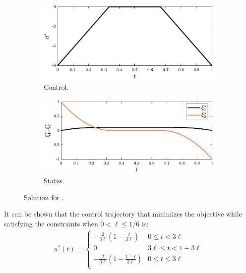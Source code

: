 \begin{figure}
\centering

\begin{subfigure}{0.5\textwidth}
\centering
\includegraphics[width=\textwidth]{../ch5/figures/ex2sol-controls}%
\caption{Control.}
\label{fig:ch5:ex2sol:controls}
\end{subfigure}%
\begin{subfigure}{0.5\textwidth}
\centering
\includegraphics[width=\textwidth]{../ch5/figures/ex2sol-states}%
\caption{States.}
\label{fig:ch5:ex2sol:states}
\end{subfigure}%

\caption{Solution for .}
\label{fig:ch5:ex2sol}
\end{figure}

It can be shown that the control trajectory that minimizes the objective while satisfying the constraints when $0 < \ell \leq 1/6$ is:
\begin{align}
u^*(t) = \begin{cases}
-\frac{2}{3\ell}\left( 1 - \frac{t}{3\ell} \right) & 0 \leq t < 3\ell \\
0 & 3\ell \leq t < 1 - 3\ell \\
-\frac{2}{3\ell}\left( 1 - \frac{1-t}{3\ell} \right) & 0 \leq t \leq 3\ell \\
\end{cases}
\end{align}

